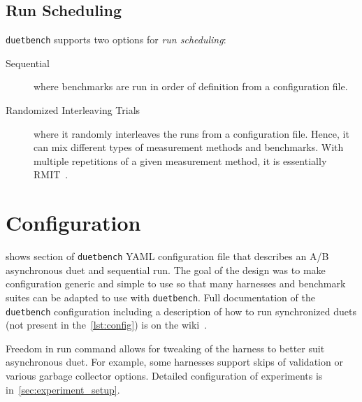 \subsection{Run Scheduling}
\label{sec:scheduling}

\lstinline{duetbench} supports two options for \emph{run scheduling}:
\begin{description}
    \item[Sequential] where benchmarks are run in order of definition from a configuration file.
    \item[Randomized Interleaving Trials] where it randomly interleaves the runs from a configuration file.
        Hence, it can mix different types of measurement methods and benchmarks.
        With multiple repetitions of a given measurement method, it is essentially RMIT~\cite{abedi2017conducting}.
\end{description}

\section{Configuration}
\label{sec:configuration}

 shows section of \lstinline{duetbench} YAML configuration file that describes an A/B asynchronous duet and sequential run.
The goal of the design was to make configuration generic and simple to use so that many harnesses and benchmark suites can be adapted to use with \lstinline{duetbench}.
Full documentation of the \lstinline{duetbench} configuration including a description of how to run synchronized duets (not present in the~\cref{lst:config}) is on the wiki~\cite{wiki}.

Freedom in run command allows for tweaking of the harness to better suit asynchronous duet.
For example, some harnesses support skips of validation or various garbage collector options.
Detailed configuration of experiments is in~\cref{sec:experiment_setup}.

